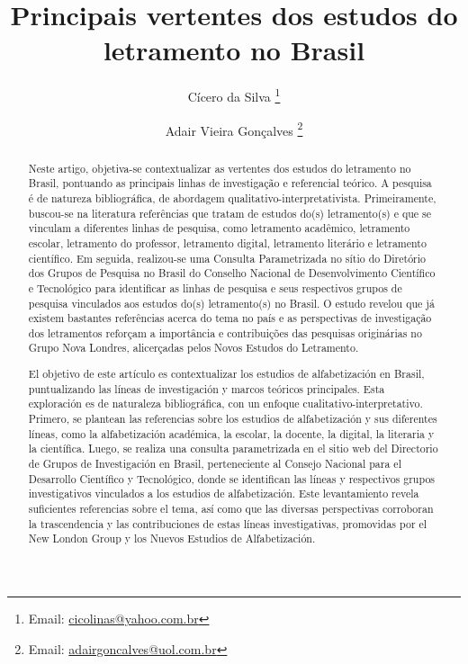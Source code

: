 \documentclass{textolivre}
\title{Principais vertentes dos estudos do letramento no Brasil}
\author[1]{Cícero da Silva \orcid{0000-0001-6071-6711} \thanks{Email: \url{cicolinas@yahoo.com.br}}}
\author[2]{Adair Vieira Gonçalves \orcid{0000-0003-4998-9692} \thanks{Email: \url{adairgoncalves@uol.com.br}}}
\affil[1]{Universidade Federal do Tocantins, Palmas, TO, Brasil.}
\affil[2]{Universidade Federal da Grande Dourados, Dourados, MS, Brasil.}
\begin{document}
\maketitle

\begin{polyabstract}
\begin{abstract}
Neste artigo, objetiva-se contextualizar as vertentes dos estudos do letramento no Brasil, pontuando as principais linhas de investigação e referencial teórico. A pesquisa é de natureza bibliográfica, de abordagem qualitativo-interpretativista. Primeiramente, buscou-se na literatura referências que tratam de estudos do(s) letramento(s) e que se vinculam a diferentes linhas de pesquisa, como letramento acadêmico, letramento escolar, letramento do professor, letramento digital, letramento literário e letramento científico. Em seguida, realizou-se uma Consulta Parametrizada no sítio do Diretório dos Grupos de Pesquisa no Brasil do Conselho Nacional de Desenvolvimento Científico e Tecnológico para identificar as linhas de pesquisa e seus respectivos grupos de pesquisa vinculados aos estudos do(s) letramento(s) no Brasil. O estudo revelou que já existem bastantes referências acerca do tema no país e as perspectivas de investigação dos letramentos reforçam a importância e contribuições das pesquisas originárias no Grupo Nova Londres, alicerçadas pelos Novos Estudos do Letramento.

\end{abstract}

\begin{spanish}
\begin{abstract}
El objetivo de este artículo es contextualizar los estudios de alfabetización en Brasil, puntualizando las líneas de investigación y marcos teóricos principales. Esta exploración es de naturaleza bibliográfica, con un enfoque cualitativo-interpretativo. Primero, se plantean las referencias sobre los estudios de alfabetización y sus diferentes líneas, como la alfabetización académica, la escolar, la docente, la digital, la literaria y la científica. Luego, se realiza una consulta parametrizada en el sitio web del Directorio de Grupos de Investigación en Brasil, perteneciente al Consejo Nacional para el Desarrollo Científico y Tecnológico, donde se identifican las líneas y respectivos grupos investigativos vinculados a los estudios de alfabetización. Este levantamiento revela suficientes referencias sobre el tema, así como que las diversas perspectivas corroboran la trascendencia y las contribuciones de estas líneas investigativas, promovidas por el New London Group y los Nuevos Estudios de Alfabetización.


\end{abstract}
\end{spanish}
\end{polyabstract}
\end{document}
